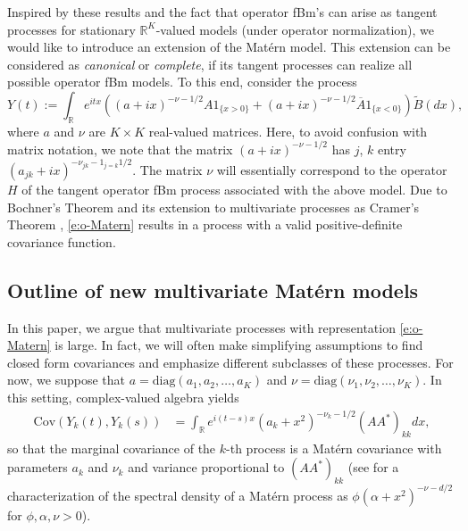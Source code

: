 \documentclass[11pt]{article}
\def\R{\mathbb R}
\begin{document}
   Inspired by these results and the fact that operator fBm's can arise as tangent processes for stationary $\R^K$-valued models (under operator normalization), we would like to introduce an extension of the Mat\'ern model. This extension can be considered as {\em canonical} or {\em complete}, if its tangent processes can realize all possible operator fBm models. To this end, consider the process
   \begin{equation}\label{e:o-Matern}
   Y(t):= \int_{\R} e^{itx} ( (a+ix)^{-\nu -1/2}A 1_{\{x>0\}} + (a+ix)^{-\nu - 1/2}\overline{A}1_{\{x<0\}}) \tilde B(dx),
   \end{equation}where $a$ and $\nu$ are $K\times K$ real-valued matrices. Here, to avoid confusion with matrix notation, we note that the matrix $(a + i x)^{-\nu - 1/2}$ has $j$, $k$ entry $(a_{jk} + ix)^{-\nu_{jk}-1_{j = k}1/2}$. The matrix $\nu$ will essentially correspond to the operator $H$ of the tangent operator fBm process associated with the above model. Due to Bochner's Theorem \citep{stein_interpolation_2013} and its extension to multivariate processes as Cramer's Theorem \citep{genton_cross-covariance_2015}, \eqref{e:o-Matern} results in a process with a valid positive-definite covariance function. 

\subsection{Outline of new multivariate Mat\'ern models}

In this paper, we argue that multivariate processes with representation \eqref{e:o-Matern} is large. 
In fact, we will often make simplifying assumptions to find closed form covariances and emphasize different subclasses of these processes. 
For now, we suppose that $a = \textrm{diag}(a_1, a_2, \dots, a_K)$ and $\nu = \textrm{diag}(\nu_1, \nu_2, \dots, \nu_K)$. 
In this setting, complex-valued algebra yields \begin{align*}
\textrm{Cov}(Y_k(t), Y_k(s)) &= \int_\mathbb{R} e^{i(t-s)x}(a_k + x^2)^{-\nu_k - 1/2}(AA^*)_{kk} dx,\end{align*}so that the marginal covariance of the $k$-th process is a Mat\'ern covariance with parameters $a_k$ and $\nu_k$ and variance proportional to $(AA^*)_{kk}$ (see \cite{stein_interpolation_2013} for a characterization of the spectral density of a Mat\'ern process as $\phi(\alpha + x^2)^{-\nu - d/2}$ for $\phi, \alpha,\nu > 0$). %
\end{document}
